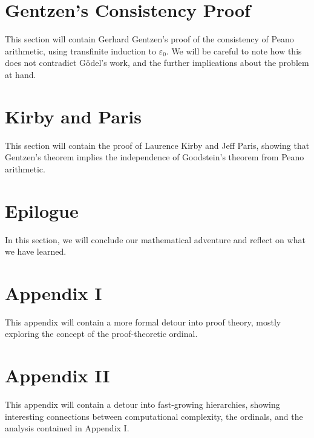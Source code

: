 \documentclass[10pt]{article}
\begin{document}
\section{Gentzen's Consistency Proof}
This section will contain Gerhard Gentzen's proof of the consistency of Peano arithmetic, using transfinite induction to $\varepsilon_0$.
We will be careful to note how this does not contradict G{\"o}del's work, and the further implications about the problem at hand.

\section{Kirby and Paris}
This section will contain the proof of Laurence Kirby and Jeff Paris, showing that Gentzen's theorem implies the independence of Goodstein's theorem from Peano arithmetic.

\section{Epilogue}
In this section, we will conclude our mathematical adventure and reflect on what we have learned.

\section{Appendix I}
This appendix will contain a more formal detour into proof theory, mostly exploring the concept of the proof-theoretic ordinal.

\section{Appendix II}
This appendix will contain a detour into fast-growing hierarchies, showing interesting connections between computational complexity, the ordinals, and the analysis contained in Appendix I.
\end{document}
